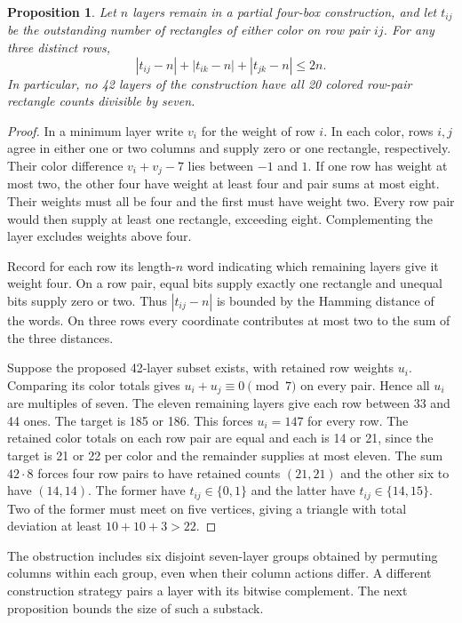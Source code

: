 \documentclass[11pt]{article}
\newtheorem{proposition}[theorem]{Proposition}
\begin{document}
\begin{proposition}\label{p:triangle}
Let $n$ layers remain in a partial four-box construction, and let $t_{ij}$ be the outstanding number of rectangles of either color on row pair $ij$. For any three distinct rows,
\[
 |t_{ij}-n|+|t_{ik}-n|+|t_{jk}-n|\le 2n .
\]
In particular, no 42 layers of the construction have all 20 colored row-pair rectangle counts divisible by seven.
\end{proposition}
\begin{proof}
In a minimum layer write $v_i$ for the weight of row $i$. In each color, rows $i,j$ agree in either one or two columns and supply zero or one rectangle, respectively. Their color difference $v_i+v_j-7$ lies between $-1$ and $1$. If one row has weight at most two, the other four have weight at least four and pair sums at most eight. Their weights must all be four and the first must have weight two. Every row pair would then supply at least one rectangle, exceeding eight. Complementing the layer excludes weights above four.

Record for each row its length-$n$ word indicating which remaining layers give it weight four. On a row pair, equal bits supply exactly one rectangle and unequal bits supply zero or two. Thus $|t_{ij}-n|$ is bounded by the Hamming distance of the words. On three rows every coordinate contributes at most two to the sum of the three distances.

Suppose the proposed 42-layer subset exists, with retained row weights $u_i$. Comparing its color totals gives $u_i+u_j\equiv0\pmod7$ on every pair. Hence all $u_i$ are multiples of seven. The eleven remaining layers give each row between 33 and 44 ones. The target is 185 or 186. This forces $u_i=147$ for every row. The retained color totals on each row pair are equal and each is 14 or 21, since the target is 21 or 22 per color and the remainder supplies at most eleven. The sum $42\cdot8$ forces four row pairs to have retained counts $(21,21)$ and the other six to have $(14,14)$. The former have $t_{ij}\in\{0,1\}$ and the latter have $t_{ij}\in\{14,15\}$. Two of the former must meet on five vertices, giving a triangle with total deviation at least $10+10+3>22$.
\end{proof}

The obstruction includes six disjoint seven-layer groups obtained by permuting columns within each group, even when their column actions differ. A different construction strategy pairs a layer with its bitwise complement. The next proposition bounds the size of such a substack.
\end{document}
